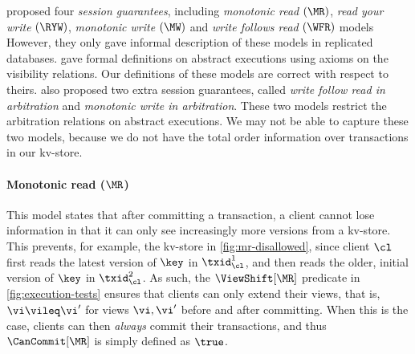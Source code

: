 \citet{session-guarantee} proposed four \emph{session guarantees},
including \emph{monotonic read} \((\MR)\), \emph{read your write} \((\RYW)\), 
\emph{monotonic write} \((\MW)\) and \emph{write follows read} \((\WFR)\) models  
However, they 
only gave informal description of these models in replicated databases.
\citet{repldatatypes} gave formal definitions on abstract executions
using axioms on the visibility relations.
Our definitions of these models are correct with respect to theirs.
\citet{repldatatypes} also proposed two extra session guarantees,
called \emph{write follow read in arbitration} and \emph{monotonic write in arbitration}.
These two models restrict the arbitration relations on abstract executions.
We may not be able to capture these two models, 
because we do not have the total order information over transactions in our kv-store.

\paragraph{Monotonic read (\( \MR \)) } 
\label{sec:et-mr} 
This model states that after committing a transaction, 
a client cannot lose information in that 
it can only see increasingly more versions from a kv-store.
This prevents, for example, the kv-store in \cref{fig:mr-disallowed},
since client \(\cl\) first reads the latest version of \(\key\) in \(\txid_{\cl}^{1}\), 
and then reads the older, initial version of \(\key\) in \(\txid_{\cl}^{2}\).  
As such, the \(\ViewShift[\MR]\) predicate in \cref{fig:execution-tests} 
ensures that clients can only extend their views,
that is, \( \vi \vileq \vi' \) for views \( \vi, \vi'\) before and after committing.
When this is the case, clients can then \emph{always} commit their transactions,
and thus \(\CanCommit[\MR]\) is simply defined as \(\true\). 

